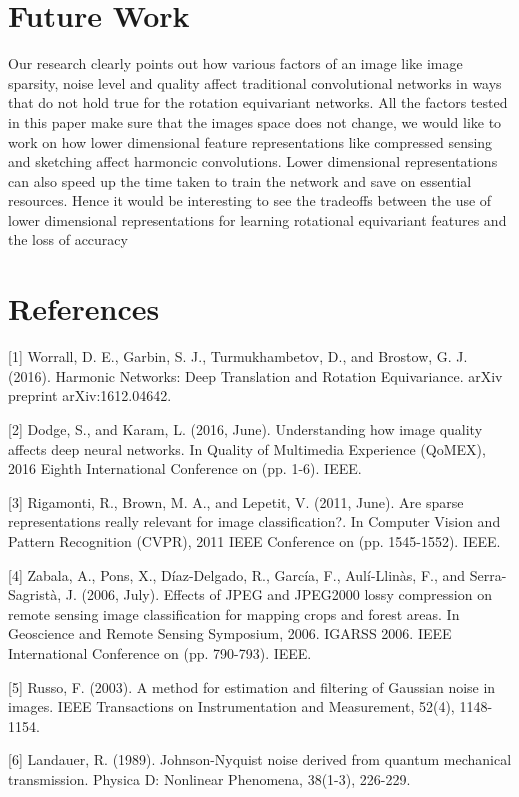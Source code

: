 \documentclass{article}
\begin{document}
\section{Future Work}
Our research clearly points out how various factors of an image like image sparsity, noise level and quality affect traditional convolutional networks in ways that do not hold true for the rotation equivariant networks. All the factors tested in this paper make sure that the images space does not change, we would like to work on how lower dimensional feature representations like compressed sensing and sketching affect harmoncic convolutions. Lower dimensional representations can also speed up the time taken to train the network and save on essential resources. Hence it would be interesting to see the tradeoffs between the use of lower dimensional representations for learning rotational equivariant features and the loss of accuracy

\section{References}
[1] Worrall, D. E., Garbin, S. J., Turmukhambetov, D., and Brostow, G. J. (2016). Harmonic Networks: Deep Translation and Rotation Equivariance. arXiv preprint arXiv:1612.04642.

[2] Dodge, S., and Karam, L. (2016, June). Understanding how image quality affects deep neural networks. In Quality of Multimedia Experience (QoMEX), 2016 Eighth International Conference on (pp. 1-6). IEEE.

[3] Rigamonti, R., Brown, M. A., and Lepetit, V. (2011, June). Are sparse representations really relevant for image classification?. In Computer Vision and Pattern Recognition (CVPR), 2011 IEEE Conference on (pp. 1545-1552). IEEE.

[4] Zabala, A., Pons, X., Díaz-Delgado, R., García, F., Aulí-Llinàs, F., and Serra-Sagristà, J. (2006, July). Effects of JPEG and JPEG2000 lossy compression on remote sensing image classification for mapping crops and forest areas. In Geoscience and Remote Sensing Symposium, 2006. IGARSS 2006. IEEE International Conference on (pp. 790-793). IEEE.

[5] Russo, F. (2003). A method for estimation and filtering of Gaussian noise in images. IEEE Transactions on Instrumentation and Measurement, 52(4), 1148-1154.

[6] Landauer, R. (1989). Johnson-Nyquist noise derived from quantum mechanical transmission. Physica D: Nonlinear Phenomena, 38(1-3), 226-229.
\end{document}
